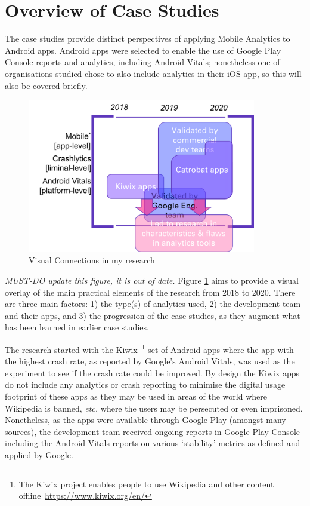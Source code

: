 

\section{Overview of Case Studies}
\label{section-overview-of-case-studies}

The case studies provide %
distinct perspectives of applying Mobile Analytics to Android apps. Android apps were selected to enable the use of Google Play Console reports and analytics, including Android Vitals; nonetheless one of organisations studied chose to also include analytics in their iOS app, so this will also be covered briefly.

\begin{figure}[htbp!]
    \centering
    \includegraphics[width=10cm]{images/visual-connections-in-research.png}
    \caption{Visual Connections in my research}
    \label{fig:visual-connections-in-research}
\end{figure}

\textit{MUST-DO update this figure, it is out of date.} Figure \ref{fig:visual-connections-in-research}  aims to provide a visual overlay of the main practical elements of the research from 2018 to 2020. There are three main factors: 1) the type(s) of analytics used, 2) the development team and their apps, and 3) the progression of the case studies, as they augment what has been learned in earlier case studies.

The research started with the Kiwix~\footnote{The Kiwix project enables people to use Wikipedia and other content offline~\url{https://www.kiwix.org/en/}} set of Android apps where the app with the highest crash rate, as reported by Google's Android Vitals, was used as the experiment to see if the crash rate could be improved. By design the Kiwix apps do not include any analytics or crash reporting to minimise the digital usage footprint of these apps as they may be used in areas of the world where Wikipedia is banned, \emph{etc.} where the users may be persecuted or even imprisoned. Nonetheless, as the apps were available through Google Play (amongst many sources), the development team received ongoing reports in Google Play Console including the Android Vitals reports on various `stability' metrics as defined and applied by Google.

